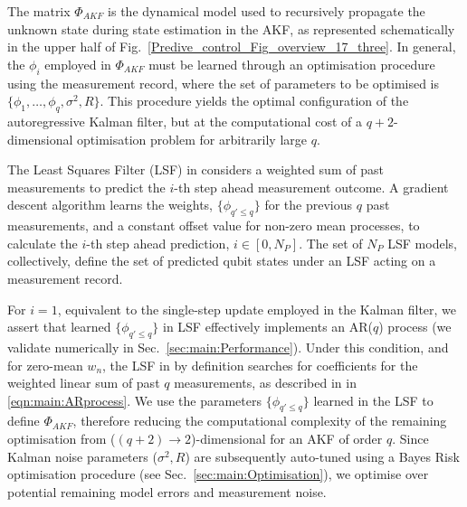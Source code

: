The matrix $\Phi_{AKF}$ is the dynamical model used to recursively propagate the unknown state during state estimation in the AKF, as represented schematically in the upper half of Fig.~\ref{Predive_control_Fig_overview_17_three}. In general, the ${\phi_i}$ employed in $\Phi_{AKF}$ must be learned through an optimisation procedure using the measurement record, where the set of parameters to be optimised is $\{\phi_1, \hdots, \phi_q, \sigma^2, R \}$. This procedure yields the optimal configuration of the autoregressive Kalman filter, but at the computational cost of a $q+2$-dimensional optimisation problem for arbitrarily large $q$.

The Least Squares Filter (LSF) in \cite{mavadia2017} considers a weighted sum of past measurements to predict the $i$-th step ahead measurement outcome. A gradient descent algorithm learns the weights, $\{\phi_{q' \leq q}\}$ for the previous $q$ past measurements, and a constant offset value for non-zero mean processes, to calculate the $i$-th step ahead prediction, $i \in [0, N_P]$. The set of $N_P$ LSF models, collectively, define the set of predicted qubit states under an LSF acting on a measurement record.

For $i=1$, equivalent to the single-step update employed in the Kalman filter, we assert that learned $\{\phi_{q' \leq q}\}$ in LSF effectively implements an AR($q$) process (we validate numerically in Sec.~\ref{sec:main:Performance}). Under this condition, and for zero-mean $w_n$, the LSF in \cite{mavadia2017} by definition searches for coefficients for the weighted linear sum of past $q$ measurements, as described in in \cref{eqn:main:ARprocess}. We use the parameters $\{\phi_{q' \leq q}\}$ learned in the LSF to define $\Phi_{AKF}$, therefore reducing the computational complexity of the remaining optimisation from ($(q+2)\to 2$)-dimensional for an AKF of order $q$. Since Kalman noise parameters ($\sigma^2, R$) are subsequently auto-tuned using a Bayes Risk optimisation procedure (see Sec.~\ref{sec:main:Optimisation}), we optimise over potential remaining model errors and measurement noise.  

